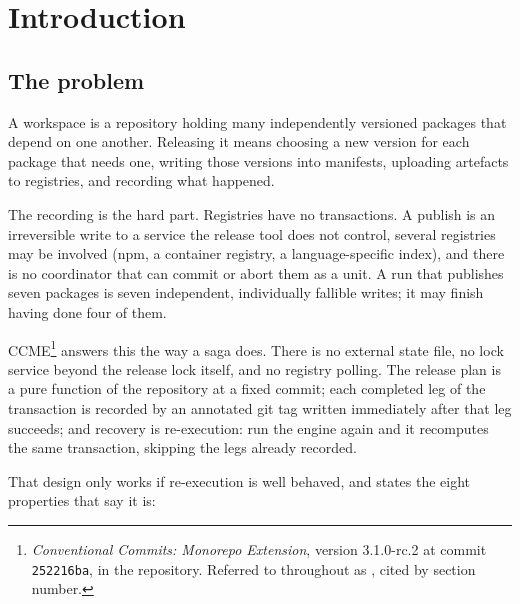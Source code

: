 \section{Introduction}
\label{sec:intro}

\subsection{The problem}

A workspace is a repository holding many independently versioned packages that
depend on one another. Releasing it means choosing a new version for each
package that needs one, writing those versions into manifests, uploading
artefacts to registries, and recording what happened.

The recording is the hard part. Registries have no transactions. A publish is an
irreversible write to a service the release tool does not control, several
registries may be involved (npm, a container registry, a language-specific
index), and there is no coordinator that can commit or abort them as a unit. A
run that publishes seven packages is seven independent, individually fallible
writes; it may finish having done four of them.

CCME\footnote{\emph{Conventional Commits: Monorepo Extension}, version
3.1.0-rc.2 at commit \texttt{252216ba},  in the
 repository. Referred to throughout as \SPEC{}, cited by section
number.} answers this the way a saga does. There is no external state file, no
lock service beyond the release lock itself, and no registry polling. The
release plan is a pure function of the repository at a fixed commit; each
completed leg of the transaction is recorded by an annotated git tag written
immediately after that leg succeeds; and recovery is re-execution: run the
engine again and it recomputes the same transaction, skipping the legs already
recorded.

That design only works if re-execution is well behaved, and  states
the eight properties that say it is:

